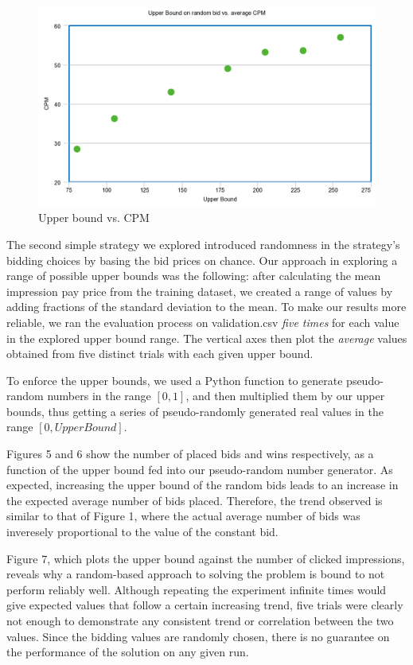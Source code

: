 \documentclass{sig-alternate-05-2015}
\begin{document}
\begin{figure}
  \includegraphics[width=\linewidth]{random_CPM.png}
  \caption{Upper bound vs. CPM}
  \label{fig:CPM}
\end{figure}

The second simple strategy we explored introduced randomness in the strategy's bidding choices by basing the bid prices on chance. Our approach in exploring a range of possible upper bounds was the following: after calculating the mean impression pay price from the training dataset, we created a range of values by adding fractions of the standard deviation to the mean. To make our results more reliable, we ran the evaluation process on validation.csv \textit{five times} for each value in the explored upper bound range. The vertical axes then plot the \textit{average} values obtained from five distinct trials with each given upper bound.

To enforce the upper bounds, we used a Python function to generate pseudo-random numbers in the range $[0,1]$, and then multiplied them by our upper bounds, thus getting a series of pseudo-randomly generated real values in the range $[0, UpperBound]$.

Figures 5 and 6 show the number of placed bids and wins respectively, as a function of the upper bound fed into our pseudo-random number generator. As expected, increasing the upper bound of the random bids leads to an increase in the expected average number of bids placed. Therefore, the trend observed is similar to that of Figure 1, where the actual average number of bids was inveresely proportional to the value of the constant bid.

Figure 7, which plots the upper bound against the number of clicked impressions, reveals why a random-based approach to solving the problem is bound to not perform reliably well. Although repeating the experiment infinite times would give expected values that follow a certain increasing trend, five trials were clearly not enough to demonstrate any consistent trend or correlation between the two values. Since the bidding values are randomly chosen, there is no guarantee on the performance of the solution on any given run.
\end{document}
